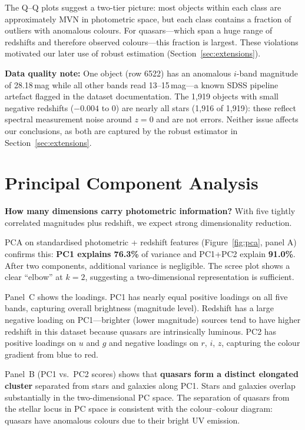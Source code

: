 \documentclass[12pt]{article}
\begin{document}
The Q--Q plots suggest a two-tier picture: most objects within each class are approximately
MVN in photometric space, but each class contains a fraction of outliers with anomalous
colours. For quasars---which span a huge range of redshifts and therefore observed
colours---this fraction is largest. These violations motivated our later use of robust
estimation (Section~\ref{sec:extensions}).

\textbf{Data quality note:} One object (row 6522) has an anomalous $i$-band magnitude of
28.18\,mag while all other bands read 13--15\,mag---a known SDSS pipeline artefact flagged
in the dataset documentation. The 1,919 objects with small negative redshifts ($-0.004$ to 0)
are nearly all stars (1,916 of 1,919): these reflect spectral measurement noise around
$z=0$ and are not errors. Neither issue affects our conclusions, as both are captured by the
robust estimator in Section~\ref{sec:extensions}.

\section{Principal Component Analysis}

\textbf{How many dimensions carry photometric information?} With five tightly correlated
magnitudes plus redshift, we expect strong dimensionality reduction.

PCA on standardised photometric + redshift features (Figure~\ref{fig:pca}, panel A)
confirms this: \textbf{PC1 explains 76.3\%} of variance and PC1+PC2 explain \textbf{91.0\%}.
After two components, additional variance is negligible. The scree plot shows a clear
``elbow'' at $k=2$, suggesting a two-dimensional representation is sufficient.

Panel~C shows the loadings. PC1 has nearly equal positive loadings on all five bands,
capturing overall brightness (magnitude level). Redshift has a large negative loading on
PC1---brighter (lower magnitude) sources tend to have higher redshift in this dataset
because quasars are intrinsically luminous. PC2 has positive loadings on $u$ and $g$
and negative loadings on $r$, $i$, $z$, capturing the colour gradient from blue to red.

Panel~B (PC1 vs.\ PC2 scores) shows that \textbf{quasars form a distinct elongated
cluster} separated from stars and galaxies along PC1. Stars and galaxies overlap
substantially in the two-dimensional PC space. The separation of quasars from the stellar
locus in PC space is consistent with the colour--colour diagram: quasars have anomalous
colours due to their bright UV emission.
\end{document}
